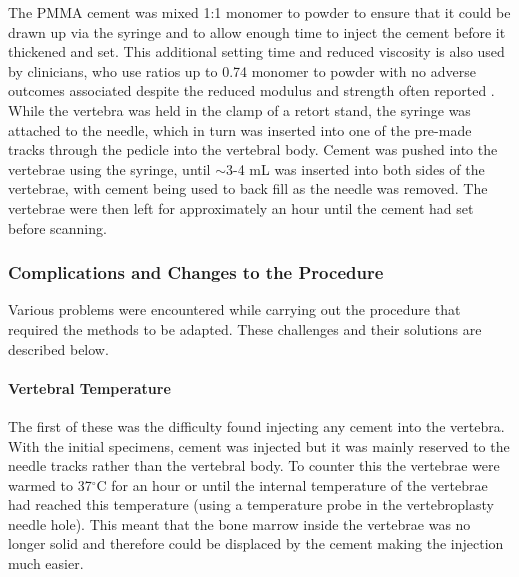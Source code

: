 The PMMA cement was mixed 1:1 monomer to powder to ensure that it could be
drawn up via the syringe and to allow enough time to inject the cement before
it thickened and set. This additional setting time and reduced viscosity is
also used by clinicians, who use ratios up to 0.74 monomer to powder with no
adverse outcomes associated despite the reduced modulus and strength often
reported \cite{Belkoff2002,Jasper1999}.  While the vertebra was held in the
clamp of a retort stand, the syringe was attached to the needle, which in turn
was inserted into one of the pre-made tracks through the pedicle into the
vertebral body.
Cement was pushed into the vertebrae using the syringe, until $\sim$3-4 mL was
inserted into both sides of the vertebrae, with cement being used to back fill
as the needle was removed. The vertebrae were then left for approximately an
hour until the cement had set before scanning.



\subsubsection{Complications and Changes to the Procedure}\label{complications}

Various problems were encountered while carrying out the procedure that
required the methods to be adapted. These challenges and their solutions are
described below.

\paragraph{Vertebral Temperature} The first of these was the difficulty found
injecting any cement into the vertebra. With the initial specimens, cement was
injected but it was mainly reserved to the needle tracks rather than the
vertebral body. To counter this the vertebrae were warmed to 37$^\circ$C for an
hour or until the internal temperature of the vertebrae had reached this
temperature (using a temperature probe in the vertebroplasty needle hole). This
meant that the bone marrow inside the vertebrae was no longer solid and
therefore could be displaced by the cement making the injection much easier.

